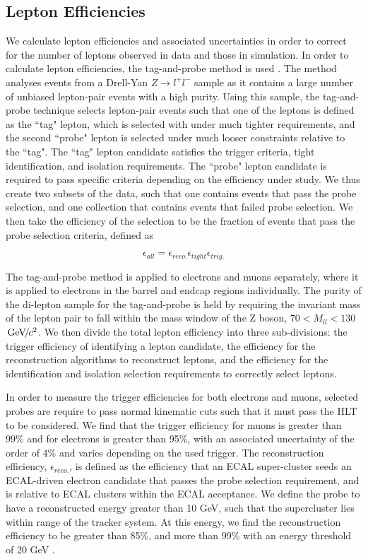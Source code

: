 \subsection{Lepton Efficiencies} \label{subsec-LeptonEfficiencies}

We calculate lepton efficiencies and associated uncertainties in order to correct for the number of leptons observed in data and those in simulation. In order to calculate lepton efficiencies, the tag-and-probe method is used \cite{tangandprobe}. The method analyses events from a Drell-Yan $Z \to l^+l^-$ sample as it contains a large number of unbiased lepton-pair events with a high purity. Using this sample, the tag-and-probe technique selects lepton-pair events such that one of the leptons is defined as the ``tag" lepton, which is selected with under much tighter requirements, and the second ``probe" lepton is selected under much looser constraints relative to the ``tag".  The ``tag" lepton candidate satisfies the trigger criteria, tight identification, and isolation requirements. The ``probe" lepton candidate is required to pass specific criteria depending on the efficiency under study. We thus create two subsets of the data, such that one contains events that pass the probe selection, and one collection that contains events that failed probe selection. We then take the efficiency of the selection to be the fraction of events that pass the probe selection criteria, defined as 

\begin{equation}
\epsilon_{all} = \epsilon_{reco.}\epsilon_{tight}\epsilon_{trig.}
\end{equation}

The tag-and-probe method is applied to electrons and muons separately, where it is applied to electrons in the barrel and endcap regions individually. The purity of the di-lepton sample for the tag-and-probe is held by requiring the invariant mass of the lepton pair to fall within the mass window of the Z boson, $70 < M_{ll} < 130$ ${\,\text{Ge\hspace{-.08em}V\hspace{-0.16em}/\hspace{-0.08em}}c^\text{2}}$. We then divide the total lepton efficiency into three sub-divisions: the trigger efficiency of identifying a lepton candidate, the efficiency for the reconstruction algorithms to reconstruct leptons, and the efficiency for the identification and isolation selection requirements to correctly select leptons. 

In order to measure the trigger efficiencies for both electrons and muons, selected probes are require to pass normal kinematic cuts such that it must pass the HLT to be considered. We find that the trigger efficiency for muons is greater than 99\% and for electrons is greater than 95\%, with an associated uncertainty of the order of 4\% and varies depending on the used trigger. The reconstruction efficiency, $\epsilon_{reco.}$, is defined as the efficiency that an ECAL super-cluster seeds an ECAL-driven electron candidate that passes the probe selection requirement, and is relative to ECAL clusters within the ECAL acceptance. We define the probe to have a reconstructed energy greater than 10 GeV, such that the supercluster lies within range of the tracker system. At this energy, we find the reconstruction efficiency to be greater than 85\%, and more than 99\% with an energy threshold of 20 GeV \cite{Khachatryan:2015hwa}.

